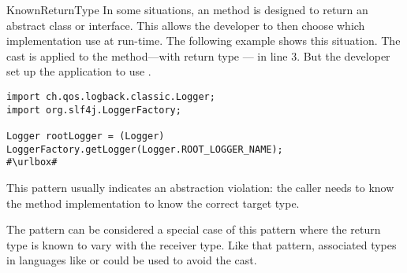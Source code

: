 \begin{pattern}{KnownReturnType}
In some situations,
an \api{} method is designed to return an abstract class or interface.
This \api{} allows the developer to then choose which implementation use at run-time.
The following example shows this situation.
The cast is applied to the  method---with return type --- in line 3.
But the developer set up the application to use .

\def\urlvar{http://bit.ly/skylot_jadx_2HIoR9X}
\begin{verbatim}
import ch.qos.logback.classic.Logger;
import org.slf4j.LoggerFactory;

Logger rootLogger = (Logger) LoggerFactory.getLogger(Logger.ROOT_LOGGER_NAME);
#\urlbox#
\end{verbatim}


\issues{}
This pattern usually indicates an abstraction violation:
the caller needs to know the method implementation to know the correct target type.

The  pattern can be considered a special case of this pattern where the return type is known to vary with the receiver type.
Like that pattern,
associated types~\citep{chakravartyAssociatedTypeSynonyms2005}
in languages like \haskell{} or \rust{} could be used to avoid the cast.

\end{pattern}